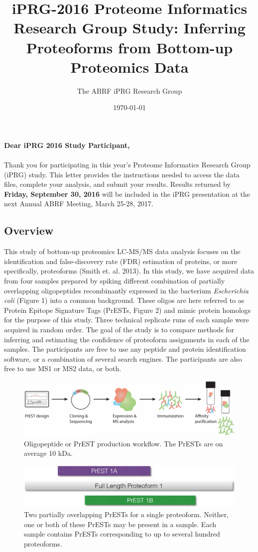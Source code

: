 \documentclass[a4paper,12pt]{article}
\title{iPRG-2016 Proteome Informatics Research Group Study: Inferring Proteoforms from Bottom-up Proteomics Data}
\author{The ABRF iPRG Research Group}
\date{\today}
\begin{document}
\maketitle
\textbf{Dear iPRG 2016 Study Participant,}\\
\\
Thank you for participating in this year's Proteome Informatics Research Group (iPRG) study. This letter provides the instructions needed to access the data files, complete your analysis, and submit your results. Results returned by \textbf{Friday, September 30, 2016} will be included in the iPRG presentation at the next Annual ABRF Meeting, March 25-28, 2017.

\subsection*{Overview}
This study of bottom-up proteomics LC-MS/MS data analysis focuses on the identification and false-discovery rate (FDR) estimation of proteins, or more specifically, proteoforms (Smith et. al. 2013). In this study, we have acquired data from four samples prepared by spiking different combination of partially overlapping oligopeptides recombinantly expressed in the bacterium \textit{Escherichia coli} (Figure 1) into a common background. These oligos are here referred to as Protein Epitope Signature Tags (PrESTs, Figure 2) and mimic protein homologs for the purpose of this study. Three technical replicate runs of each sample were acquired in random order. The goal of the study is to compare methods for inferring and estimating the confidence of proteoform assignments in each of the samples. The participants are free to use any peptide and protein identification software, or a combination of several search engines. The participants are also free to use MS1 or MS2 data, or both. \clearpage
\begin{figure}[h]
\includegraphics[width=13cm]{Figure_1}
\centering
\caption{Oligopeptide or PrEST production workflow. The PrESTs are on average 10 kDa.}
\end{figure}

\begin{figure}[h]
\includegraphics[width=13cm]{Figure_2}
\centering
\caption{Two partially overlapping PrESTs for a single proteoform. Neither, one or both of these PrESTs may be present in a sample. Each sample contains PrESTs corresponding to up to several hundred proteoforms.}
\end{figure}
\end{document}
